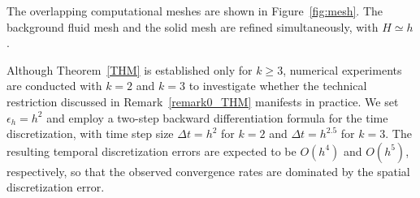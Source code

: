 \documentclass[11pt,reqno]{amsart}
\theoremstyle{definition}
\theoremstyle{plain}
\numberwithin{theorem}{section}
\numberwithin{proposition}{section}
\numberwithin{lemma}{section}
\numberwithin{equation}{section}
\renewcommand{\(}{\bigl(}
\renewcommand{\)}{\bigr)}
\begin{document}

The overlapping computational meshes are  shown in Figure~\ref{fig:mesh}. The background fluid mesh and the solid mesh are refined simultaneously, with $H\simeq h$. 


 



Although Theorem~\ref{THM} is established only for $k\geq3$, numerical  experiments  are conducted with $k=2$ and $k=3$  to investigate whether the technical restriction discussed in Remark~\ref{remark0_THM} manifests in practice. We set $\epsilon_h=h^2$ and employ a two-step backward differentiation formula for the time discretization, with time step size $\Delta t=h^2$ for $k=2$ and $\Delta t=h^{2.5}$ for $k=3$. The resulting temporal discretization errors are expected to be $O(h^4)$ and $O(h^5)$, respectively, so that the observed convergence rates are dominated by the spatial discretization error. 

\end{document}
